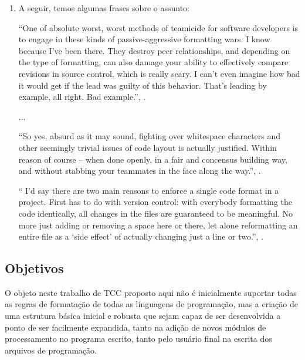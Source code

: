 \begin{enumerate}[leftmargin=*]
        \item

        A seguir, temos algumas frases sobre o assunto:

        \begin{myquote}
        ``One of absolute worst, worst methods of teamicide for software developers is to engage
        in these kinds of passive-aggressive formatting wars. I know because I've been there.
        They destroy peer relationships, and depending on the type of formatting, can also damage
        your ability to effectively compare revisions in source control, which is really scary.
        I can't even imagine how bad it would get if the lead was guilty of this behavior. That's
        leading by example, all right. Bad example.'', \cite{Atwood}.
        \end{myquote}
        \vspace{-5mm}
        ...
        \begin{myquote}
        ``So yes, absurd as it may sound, fighting over whitespace characters and other seemingly
        trivial issues of code layout is actually justified. Within reason of course -- when done
        openly, in a fair and concensus building way, and without stabbing your teammates in the
        face along the way.'', \cite{Atwood}.
        \end{myquote}

        \begin{myquote}``
        I'd say there are two main reasons to enforce a single code format in a project. First has
        to do with version control: with everybody formatting the code identically, all changes in
        the files are guaranteed to be meaningful. No more just adding or removing a space here or
        there, let alone reformatting an entire file as a `side effect' of actually changing just a
        line or two.'', \cite{Geukens}.
        \end{myquote}

    \end{enumerate}



\subsection{Objetivos}

    O objeto neste trabalho de TCC proposto aqui não é inicialmente suportar todas as regras de
    formatação de todas as linguagens de programação, mas a criação de uma estrutura básica inicial
    e robusta que sejam capaz de ser desenvolvida a ponto de ser facilmente expandida, tanto na
    adição de novos módulos de processamento no programa escrito, tanto pelo usuário final na
    escrita dos arquivos de programação.

